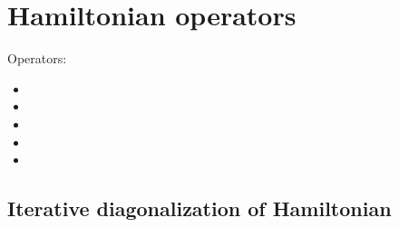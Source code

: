 \section{Hamiltonian operators}



Operators:
\begin{itemize}
\item {}
\item {}
\item {}
\item {}
\item {}
\end{itemize}

\subsection{Iterative diagonalization of Hamiltonian}
